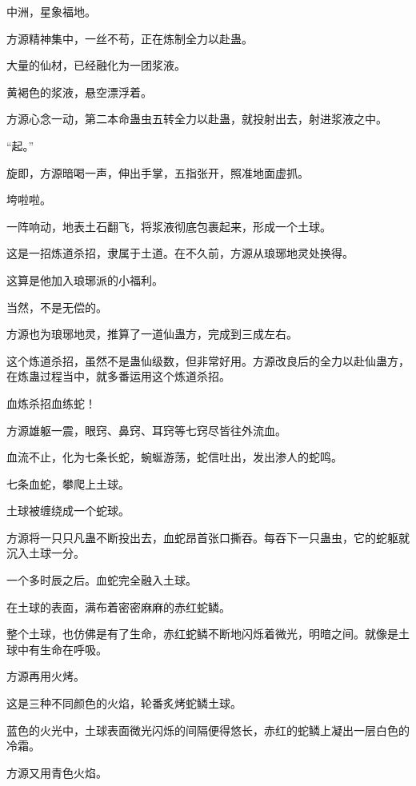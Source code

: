 
\begin{this_body}



中洲，星象福地。

方源精神集中，一丝不苟，正在炼制全力以赴蛊。

大量的仙材，已经融化为一团浆液。

黄褐色的浆液，悬空漂浮着。

方源心念一动，第二本命蛊虫五转全力以赴蛊，就投射出去，射进浆液之中。

“起。”

旋即，方源暗喝一声，伸出手掌，五指张开，照准地面虚抓。

垮啦啦。

一阵响动，地表土石翻飞，将浆液彻底包裹起来，形成一个土球。

这是一招炼道杀招，隶属于土道。在不久前，方源从琅琊地灵处换得。

这算是他加入琅琊派的小福利。

当然，不是无偿的。

方源也为琅琊地灵，推算了一道仙蛊方，完成到三成左右。

这个炼道杀招，虽然不是蛊仙级数，但非常好用。方源改良后的全力以赴仙蛊方，在炼蛊过程当中，就多番运用这个炼道杀招。

血炼杀招血练蛇！

方源雄躯一震，眼窍、鼻窍、耳窍等七窍尽皆往外流血。

血流不止，化为七条长蛇，蜿蜒游荡，蛇信吐出，发出渗人的蛇鸣。

七条血蛇，攀爬上土球。

土球被缠绕成一个蛇球。

方源将一只只凡蛊不断投出去，血蛇昂首张口撕吞。每吞下一只蛊虫，它的蛇躯就沉入土球一分。

一个多时辰之后。血蛇完全融入土球。

在土球的表面，满布着密密麻麻的赤红蛇鳞。

整个土球，也仿佛是有了生命，赤红蛇鳞不断地闪烁着微光，明暗之间。就像是土球中有生命在呼吸。

方源再用火烤。

这是三种不同颜色的火焰，轮番炙烤蛇鳞土球。

蓝色的火光中，土球表面微光闪烁的间隔便得悠长，赤红的蛇鳞上凝出一层白色的冷霜。

方源又用青色火焰。


\end{this_body}
